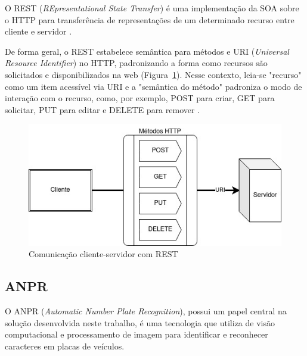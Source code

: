 \documentclass[12pt]{article}
\begin{document}
O REST (\textit{REpresentational State Transfer}) é uma implementação da SOA sobre o HTTP para transferência de representações de um determinado recurso entre cliente e servidor \cite{mumbaikar2013}.

De forma geral, o REST estabelece semântica para métodos e URI (\textit{Universal Resource Identifier}) no HTTP, padronizando a forma como recursos são solicitados e disponibilizados na web (Figura~\ref{fig:rest}). Nesse contexto, leia-se "recurso" como um item acessível via URI e a "semântica do método" padroniza o modo de interação com o recurso, como, por exemplo, {\scriptsize POST} para criar, {\scriptsize GET} para solicitar, {\scriptsize PUT} para editar e {\scriptsize DELETE} para remover \cite{adamczyk2011}.

\begin{figure}[ht]
	\centering
	\includegraphics[width=.8\textwidth]{rest.jpg}
	\caption{Comunicação cliente-servidor com REST}
	\label{fig:rest}
\end{figure} 


\subsection{ANPR}

O ANPR (\textit{Automatic Number Plate Recognition}), possui um papel central na solução desenvolvida neste trabalho, é uma tecnologia que utiliza de visão computacional e processamento de imagem para identificar e reconhecer caracteres em placas de veículos.

\end{document}
